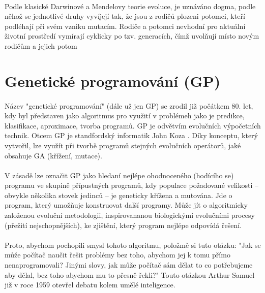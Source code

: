 \documentclass[bc,male,java,dept460]{diploma}		%
\begin{document}
\paragraph*{}
Podle klasické Darwinové a Mendelovy teorie evoluce, je uznáváno dogma, podle něhož se jednotlivé druhy vyvíjejí tak, že jsou z rodičů plozeni potomci, kteří podléhají při svém vzniku mutacím. Rodiče a potomci nevhodní pro aktuální životní prostředí vymírají cyklicky po tzv. generacích, čímž uvolňují místo novým rodičům a jejich potom

\section{Genetické programování (GP)}
\paragraph*{}
Název "genetické programování" (dále už jen GP) se zrodil již počátkem 80. let, kdy byl představen jako algoritmus pro využití v problémeh jako je predikce, klasifikace, aproximace, tvorba programů. GP je odvětvím evolučních výpočetních technik.
Otcem GP je standfordský informatik John Koza \cite{kozagp,kozagp2}. Díky konceptu, který vytvořil, lze využít při tvorbě programů stejných evolučních operátorů, jaké obsahuje GA (křížení, mutace).

\paragraph*{}
V zásadě lze označit GP jako hledaní nejlépe ohodnoceného (hodícího se) programu ve skupině přípustných programů, kdy populace požadované velikosti – obvykle několika stovek jedinců – je geneticky křížena a mutována.
Jde o program, který umožňuje konstruovat další programy. Může jít o algoritmicky založenou evoluční metodologii, inspirovananou biologickými evolučními procesy (přežití nejschopnějších), ke zjištění, který program nejlépe odpovídá řešení.

\paragraph*{}
Proto, abychom pochopili smysl tohoto algoritmu, položmě si tuto otázku: "Jak se může počítač naučit řešit  problémy bez toho, abychom jej k tomu přímo nenaprogramovali? Jinými slovy, jak může počítač sám dělat to co potřebujeme aby dělal, bez toho abychom mu to přesně řekli?" Touto otázkou Arthur Samuel již v roce 1959 otevřel debatu kolem umělé inteligence.
\end{document}
